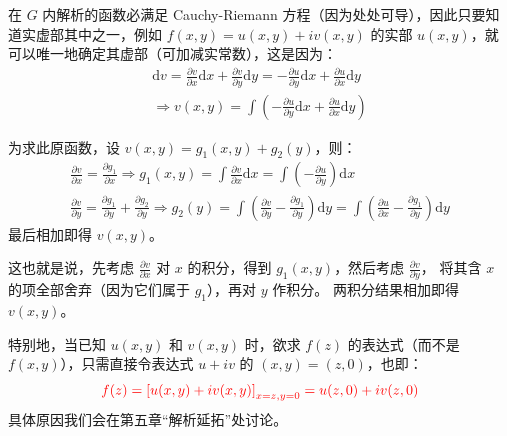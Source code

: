 \documentclass[UTF8]{report}
\theoremstyle{MyLineTheoremStyle} %
\theoremstyle{MyBlockTheoremStyle} %
\theoremstyle{MySubsubsectionStyle} %
\begin{document}
在 $G$ 内解析的函数必满足 Cauchy-Riemann 方程（因为处处可导），因此只要知道实虚部其中之一，例如 $f(x,y) = u(x,y) + iv(x,y)$ 的实部 $u(x,y)$，就可以唯一地确定其虚部（可加减实常数），这是因为：
\begin{gather}
\mathrm{d} v = \frac{\partial v }{\partial x }\mathrm{d}x + \frac{\partial v }{\partial y } \mathrm{d}y = - \frac{\partial u}{\partial y } \mathrm{d}x + \frac{\partial u}{\partial x } \mathrm{d}y \\ \Longrightarrow
v(x,y) = \int \left( - \frac{\partial u}{\partial y } \mathrm{d}x + \frac{\partial u}{\partial x } \mathrm{d}y  \right)
\end{gather}


为求此原函数，设 $v(x,y) = g_1(x,y) + g_2(y)$，则：
\begin{gather}
\frac{\partial v }{\partial x} = \frac{\partial g_1 }{\partial x } 
\Longrightarrow 
g_1(x,y) = \int \frac{\partial v }{\partial x } \mathrm{d} x = \int (- \frac{\partial u }{\partial y }) \mathrm{d}x
\\ 
\frac{\partial v }{\partial y } = \frac{\partial g_1 }{\partial y } + \frac{\partial g_2 }{\partial y } \Longrightarrow 
g_2(y) = \int (\frac{\partial v }{\partial y } - \frac{\partial g_1 }{\partial y }) \mathrm{d}y = \int (\frac{\partial u }{\partial x } - \frac{\partial g_1 }{\partial y }) \mathrm{d}y 
\end{gather}
最后相加即得 $v(x,y)$。

这也就是说，先考虑 $\frac{\partial v }{\partial x }$ 对 $x$ 的积分，得到 $g_1(x,y)$，然后考虑 $\frac{\partial v }{\partial y }$，{\color{red} 将其含 $x$ 的项全部舍弃}（因为它们属于 $g_1$），再对 $y$ 作积分。{\color{red} 两积分结果相加即得 $v(x,y)$。}

特别地，当已知 $u(x,y)$ 和 $v(x,y)$ 时，欲求 $f(z)$ 的表达式（而不是 $f(x,y)$），只需直接令表达式 $u + iv$ 的 $(x,y) = (z,0)$，也即： 
\begin{equation}
{\color{red} f(z) = \left[u(x,y) + iv(x,y)\right]_{x = z, y=0} = u(z,0) + iv(z,0)}
\end{equation}
具体原因我们会在第五章“解析延拓”处讨论。
\end{document}
